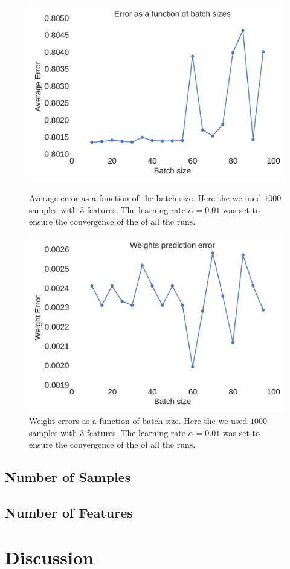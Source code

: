 \documentclass[11pt,a4paper]{article}
\begin{document}
\begin{figure}[H]
	\centering
  \includegraphics[width=\linewidth]{errors_batch_scaling.pdf}
  \caption{Average error as a function of the batch size. Here the we used $1000$ samples with $3$ features. The learning rate $\alpha=0.01$ was set to ensure the convergence of the of all the runs.}
  \label{fig:test_batch_size_error}
\endminipage
\hfill
{}
  \includegraphics[width=\linewidth]{weights_errors_batch_scaling.pdf}
  \caption{Weight errors as a function of batch size. Here the we used $1000$ samples with $3$ features. The learning rate $\alpha=0.01$ was set to ensure the convergence of the of all the runs.}
  \label{fig:test_batch_size_werror}
\endminipage
\end{figure}

\subsection{Number of Samples}


\subsection{Number of Features}


\section{Discussion}



\end{document}
